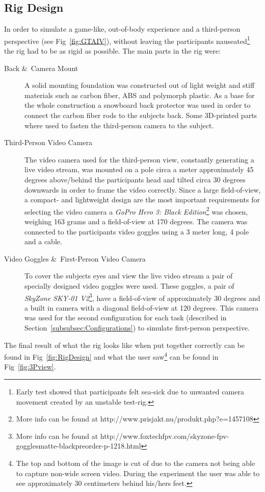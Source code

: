\documentclass[runningheads,a4paper,oribibl]{llncs}
\begin{document}
\subsection{Rig Design}
In order to simulate a game-like, out-of-body experience and a third-person perspective (see Fig~\ref{fig:GTAIV}), without leaving the participants nauseated\footnote{Early test showed that participants felt sea-sick due to unwanted camera movement created by an unstable test-rig.} the rig had to be as rigid as possible. The main parts in the rig were:
\begin{description}
	\item[Back \&\ Camera Mount] A solid mounting foundation was constructed out of light weight and stiff materials such as carbon fiber, ABS and polymorph plastic. As a base for the whole construction a snowboard back protector was used in order to connect the carbon fiber rods to the subjects back. Some 3D-printed parts where used to fasten the third-person camera to the subject.

	\item[Third-Person Video Camera] The video camera used for the third-person view, constantly generating a live video stream, was mounted on a pole circa a meter approximately 45 degrees above/behind the participants head and tilted circa 30 degrees downwards in order to frame the video correctly. Since a large field-of-view, a compact- and lightweight design are the most important requirements for selecting the video camera a \emph{GoPro Hero 3: Black Edition}\footnote{More info can be found at http://www.prisjakt.nu/produkt.php?e=1457108} was chosen, weighing 163 grams and a field-of-view at 170 degrees. The camera was connected to the participants video goggles using a 3 meter long, 4 pole and a cable.

	\item[Video Goggles \&\ First-Person Video Camera] To cover the subjects eyes and view the live video stream a pair of specially designed video goggles were used. These goggles, a pair of \emph{SkyZone SKY-01 V2}\footnote{More info can be found at http://www.foxtechfpv.com/skyzone-fpv-gogglesmatte-blackpreorder-p-1218.html}, have a field-of-view of approximately 30 degrees and a built in camera with a diagonal field-of-view at 120 degrees. This camera was used for the second configuration for each task (described in Section~\ref{subsubsec:Configurations}) to simulate first-person perspective.
\end{description}
The final result of what the rig looks like when put together correctly can be found in Fig~\ref{fig:RigDesign} and what the user saw\footnote{The top and bottom of the image is cut of due to the camera not being able to capture non-wide screen video. During the experiment the user was able to see approximately 30 centimeters behind his/hers feet.} can be found in Fig~\ref{fig:3Pview}.
\end{document}
